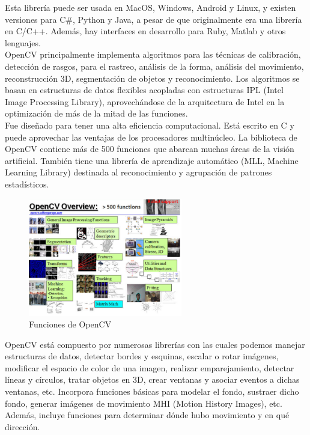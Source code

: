 Esta librería puede ser usada en MacOS, Windows, Android y Linux, y existen versiones para C\#, Python y Java, a pesar de que originalmente era una librería en C/C++. Además, hay interfaces en desarrollo para Ruby, Matlab y otros lenguajes.\\

OpenCV principalmente implementa algoritmos para las técnicas de calibración, detección de rasgos, para el rastreo, análisis de la forma, análisis del movimiento, reconstrucción 3D, segmentación de objetos y reconocimiento. Los algoritmos se basan en estructuras de datos flexibles acopladas con estructuras IPL (Intel Image Processing Library), aprovechándose de la arquitectura de Intel en la optimización de más de la mitad de las funciones. \\

Fue diseñado para tener una alta eficiencia computacional. Está escrito en C y puede aprovechar las ventajas de los procesadores multinúcleo. La biblioteca de OpenCV contiene más de 500 funciones que abarcan muchas áreas de la visión artificial. También tiene una librería de aprendizaje automático (MLL, Machine Learning Library) destinada al reconocimiento y agrupación de patrones estadísticos.\\

\begin{figure}[H]
  \begin{center}
    \includegraphics[width=0.6\textwidth]{figures/Estado_arte/opencv.png}
		\caption{Funciones de OpenCV}
		\label{fig.opencv}
		\end{center}
\end{figure}

OpenCV está compuesto por numerosas librerías con las cuales podemos manejar estructuras de datos, detectar bordes y esquinas, escalar o rotar imágenes, modificar el espacio de color de una imagen, realizar emparejamiento, detectar líneas y círculos, tratar objetos en 3D, crear ventanas y asociar eventos a dichas ventanas, etc. Incorpora funciones básicas para modelar el fondo, sustraer dicho fondo, generar imágenes de movimiento MHI (Motion History Images), etc. Además, incluye funciones para determinar dónde hubo movimiento y en qué dirección. \\

